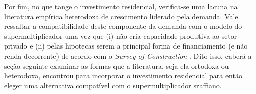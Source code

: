 
Por fim, no que tange o investimento residencial, verifica-se uma lacuna na literatura empírica heterodoxa de crescimento liderado pela demanda. Vale ressaltar a compatibilidade deste componente da demanda com o modelo do supermultiplicador uma vez que (i) não cria   capacidade produtiva ao setor privado e (ii) pelas hipotecas serem a principal forma de financiamento (e não renda decorrente) de acordo com o \textit{Survey of Construction} \cite{us_census_bureau_characteristics_2017}. Dito isso, caberá a seção seguinte examinar as formas que a literatura, seja ela ortodoxa ou heterodoxa, encontrou para incorporar o investimento residencial para então eleger uma alternativa compatível com o supermultiplicador sraffiano.